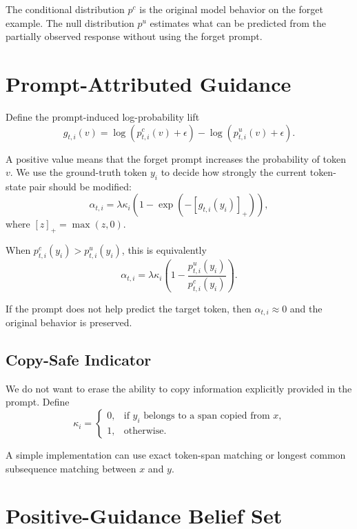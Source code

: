 \documentclass[10pt]{article}
\begin{document}
The conditional distribution $p^c$ is the original model behavior on the
forget example. The null distribution $p^u$ estimates what can be predicted
from the partially observed response without using the forget prompt.

\section{Prompt-Attributed Guidance}

Define the prompt-induced log-probability lift
\begin{equation}
g_{t,i}(v)=
\log\left(p^c_{t,i}(v)+\epsilon\right)
-
\log\left(p^u_{t,i}(v)+\epsilon\right).
\end{equation}

A positive value means that the forget prompt increases the probability of
token $v$. We use the ground-truth token $y_i$ to decide how strongly the
current token-state pair should be modified:
\begin{equation}
\alpha_{t,i}
=
\lambda\kappa_i
\left(1-\exp\left(-[g_{t,i}(y_i)]_+\right)\right),
\end{equation}
where $[z]_+=\max(z,0)$.

When $p^c_{t,i}(y_i)>p^u_{t,i}(y_i)$, this is equivalently
\begin{equation}
\alpha_{t,i}
=
\lambda\kappa_i
\left(
1-\frac{p^u_{t,i}(y_i)}{p^c_{t,i}(y_i)}
\right).
\end{equation}

If the prompt does not help predict the target token, then
$\alpha_{t,i}\approx0$ and the original behavior is preserved.

\subsection{Copy-Safe Indicator}

We do not want to erase the ability to copy information explicitly provided in
the prompt. Define
\begin{equation}
\kappa_i=
\begin{cases}
0, & \text{if $y_i$ belongs to a span copied from $x$,}\\
1, & \text{otherwise.}
\end{cases}
\end{equation}

A simple implementation can use exact token-span matching or longest common
subsequence matching between $x$ and $y$.

\section{Positive-Guidance Belief Set}
\end{document}
